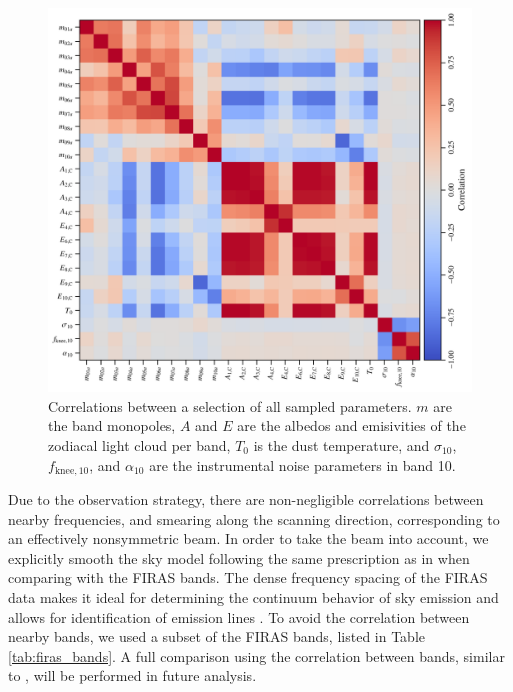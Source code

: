 \documentclass{aa}
\begin{document}
\begin{figure}
    \centering
    \includegraphics[width=1\textwidth]{figs/covmatrix.pdf}
	\caption{Correlations between a selection of all sampled parameters. $m$ are the band monopoles, $A$ and $E$ are the albedos and emisivities of the zodiacal light cloud per band, $T_0$ is the dust temperature, and $\sigma_10$, $f_{\mathrm{knee}, 10}$, and $\alpha_{10}$ are the instrumental noise parameters in band 10.}
    \label{fig:correlations}
\end{figure}


Due to the observation strategy, there are non-negligible correlations between nearby frequencies, and smearing along the scanning direction, corresponding to an effectively nonsymmetric beam. In order to take the beam into account, we explicitly smooth the sky model following the same prescription as in \citet{odegard:2019} when comparing with the FIRAS bands. 
The dense frequency spacing of the FIRAS data makes it ideal for determining the continuum behavior of sky emission and allows for identification of emission lines \citep{bennett:1994}. 
To avoid the correlation between nearby bands, we used a subset of the FIRAS bands, listed in Table \ref{tab:firas_bands}. A full comparison using the correlation between bands, similar to \citet{bianchini:2022}, will be performed in future analysis.


\end{document}

